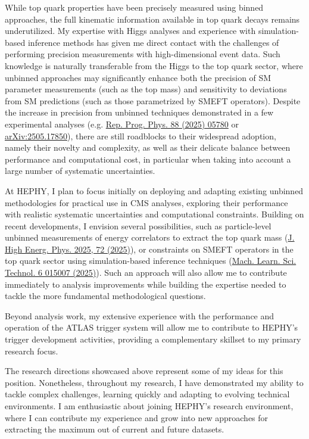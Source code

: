 \documentclass[11pt, a4paper]{awesome-cv}
\begin{document}
\begin{cvletter}

  While top quark properties have been precisely measured using binned approaches, the full kinematic information available in top quark decays remains underutilized. My expertise with Higgs analyses and experience with simulation-based inference methods has given me direct contact with the challenges of performing precision measurements with high-dimensional event data. Such knowledge is naturally transferable from the Higgs to the top quark sector, where unbinned approaches may significantly enhance both the precision of SM parameter measurements (such as the top mass) and sensitivity to deviations from SM predictions (such as those parametrized by SMEFT operators). Despite the increase in precision from unbinned techniques demonstrated in a few experimental analyses (e.g. \href{https://doi.org/10.1088/1361-6633/adcd9a}{Rep. Prog. Phys. 88 (2025) 05780} or \href{https://arxiv.org/abs/2505.17850}{arXiv:2505.17850}), there are still roadblocks to their widespread adoption, namely their novelty and complexity, as well as their delicate balance between performance and computational cost, in particular when taking into account a large number of systematic uncertainties.
    
  At HEPHY, I plan to focus initially on deploying and adapting existing unbinned methodologies for practical use in CMS analyses, exploring their performance with realistic systematic uncertainties and computational constraints. Building on recent developments, I envision several possibilities, such as particle-level unbinned measurements of energy correlators to extract the top quark mass (\href{https://doi.org/10.1007/JHEP04(2025)072}{J. High Energ. Phys. 2025, 72 (2025)}), or constraints on SMEFT operators in the top quark sector using simulation-based inference techniques (\href{https://doi.org/10.1088/2632-2153/ad9fd1}{Mach. Learn. Sci. Technol. 6 015007 (2025)}). Such an approach will also allow me to contribute immediately to analysis improvements while building the expertise needed to tackle the more fundamental methodological questions. 

  Beyond analysis work, my extensive experience with the performance and operation of the ATLAS trigger system will allow me to contribute to HEPHY's trigger development activities, providing a complementary skillset to my primary research focus.

  The research directions showcased above represent some of my ideas for this position. Nonetheless, throughout my research, I have demonstrated my ability to tackle complex challenges, learning quickly and adapting to evolving technical environments. I am enthusiastic about joining HEPHY's research environment, where I can contribute my experience and grow into new approaches for extracting the maximum out of current and future datasets.

\end{cvletter}

\makeletterclosing
\end{document}
